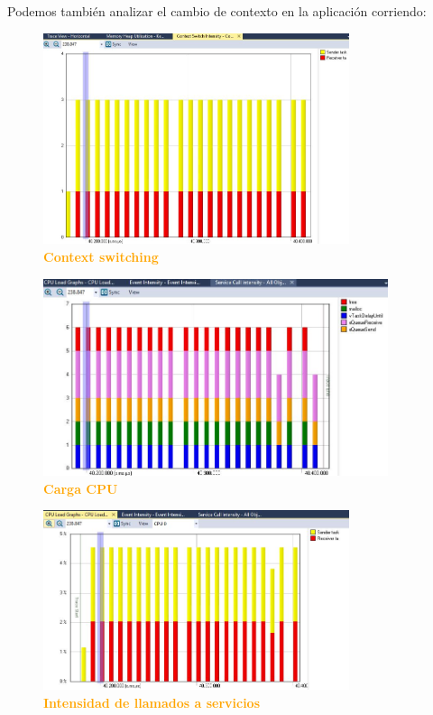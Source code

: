 \documentclass{article}
\begin{document}
Podemos también analizar el cambio de contexto en la aplicación corriendo:\\
\begin{figure}[H]
   \centering
   \includegraphics[width=0.8\textwidth]{figures/trace2.jpg}
   \centering
   \caption{\textbf{\textcolor{Orange}{Context switching}}}
\end{figure}

\begin{figure}[H]
   \centering
   \includegraphics[width=0.9\textwidth]{figures/trace3.jpg}
   \centering
   \caption{\textbf{\textcolor{Orange}{Carga CPU}}}
\end{figure}

\begin{figure}[H]
   \centering
   \includegraphics[width=0.8\textwidth]{figures/trace4.jpg}
   \centering
   \caption{\textbf{\textcolor{Orange}{Intensidad de llamados a servicios}}}
\end{figure}
\end{document}
